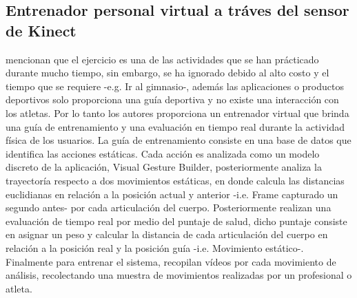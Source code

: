 \subsection{Entrenador personal virtual a tr\'aves del sensor de Kinect} \label{tr:6}
 mencionan que el ejercicio es una de las actividades que se han pr\'acticado durante mucho tiempo, sin embargo, se ha ignorado debido al alto costo y el tiempo que se requiere -e.g. Ir al gimnasio-, adem\'as las aplicaciones o productos deportivos solo proporciona una gu\'ia deportiva y no existe una interacci\'on con los atletas. Por lo tanto los autores proporciona un entrenador virtual que brinda una gu\'ia de entrenamiento y una evaluaci\'on en tiempo real durante la actividad f\'isica de los usuarios.
\medbreak
La gu\'ia de entrenamiento consiste en una base de datos que identifica las acciones est\'aticas. Cada acci\'on es analizada como un modelo discreto de la aplicaci\'on, Visual Gesture Builder, posteriormente analiza la trayector\'ia  respecto a dos movimientos est\'aticas, en donde calcula las distancias euclidianas en relaci\'on a la posici\'on actual y anterior -i.e. Frame capturado un segundo antes- por cada articulaci\'on del cuerpo.
\medbreak 
Posteriormente realizan una evaluaci\'on de tiempo real por medio del puntaje de salud, dicho puntaje consiste en asignar un peso y calcular la distancia de cada articulaci\'on del cuerpo en relaci\'on a la posici\'on real y la posici\'on gu\'ia -i.e. Movimiento est\'atico-.
\medbreak 
Finalmente para entrenar el sistema,  recopilan v\'ideos por cada movimiento de an\'alisis, recolectando una muestra  de movimientos realizadas por un profesional o atleta.
